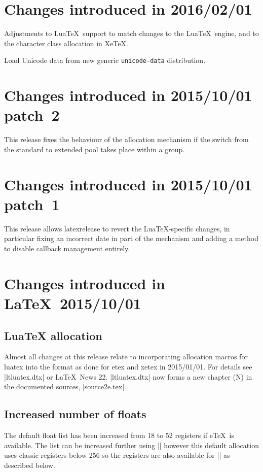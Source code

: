 \documentclass{ltxguide}
\newcommand\Lpack[1]{\mbox{\textsf{#1}}}
\begin{document}
\section{Changes  introduced in 2016/02/01}
Adjustments to Lua\TeX\ support to match changes to the Lua\TeX\ engine,
and to the character class allocation in Xe\TeX.

Load Unicode data from new generic \texttt{unicode-data} distribution.

\section{Changes  introduced in 2015/10/01 patch~2}

This release fixes the behaviour of the allocation mechanism if the switch
from the standard to extended pool takes place within a group.

\section{Changes  introduced in 2015/10/01 patch~1}
This release allows \Lpack{latexrelease} to revert the 
Lua\TeX{}-specific
changes, in particular fixing an incorrect date in part of the mechanism and
adding a method to disable callback management entirely.

\section{Changes  introduced in \LaTeX\ 2015/10/01}

\subsection{LuaTeX allocation}
Almost all changes at this release relate to incorporating allocation macros for luatex into the format
as done for etex and xetex in 2015/01/01. For details see |ltluatex.dtx| or \LaTeX\ News 22.
|ltluatex.dtx| now forms a new chapter (N) in the documented sources, |source2e.tex|.


\subsection{Increased number of floats}
The default float list has been increased from 18 to 52 registers if
e\TeX\ is available.
The list can be increased further using |\extrafloats| however this
default allocation uses classic registers below 256 so the registers are
also available for |\newinsert| as described below.
\end{document}
